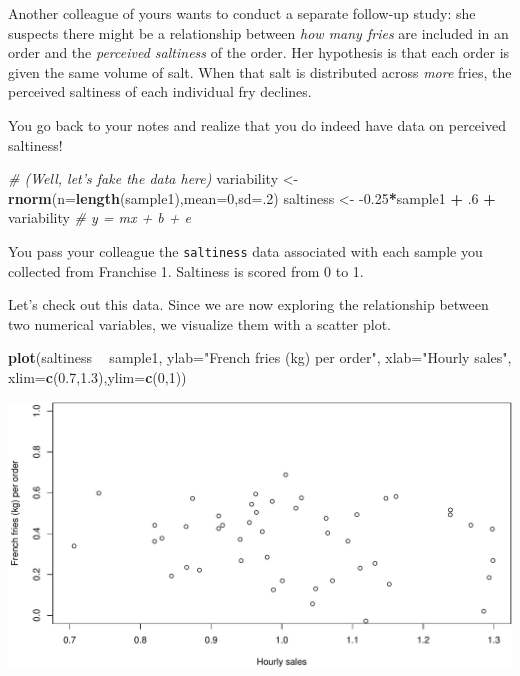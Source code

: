 \documentclass[]{book}
\newenvironment{Shaded}{\begin{snugshade}}{\end{snugshade}}
\newcommand{\CommentTok}[1]{\textcolor[rgb]{0.56,0.35,0.01}{\textit{#1}}}
\newcommand{\DataTypeTok}[1]{\textcolor[rgb]{0.13,0.29,0.53}{#1}}
\newcommand{\DecValTok}[1]{\textcolor[rgb]{0.00,0.00,0.81}{#1}}
\newcommand{\FloatTok}[1]{\textcolor[rgb]{0.00,0.00,0.81}{#1}}
\newcommand{\KeywordTok}[1]{\textcolor[rgb]{0.13,0.29,0.53}{\textbf{#1}}}
\newcommand{\NormalTok}[1]{#1}
\newcommand{\OperatorTok}[1]{\textcolor[rgb]{0.81,0.36,0.00}{\textbf{#1}}}
\newcommand{\StringTok}[1]{\textcolor[rgb]{0.31,0.60,0.02}{#1}}
\begin{document}
Another colleague of yours wants to conduct a separate follow-up study: she suspects there might be a relationship between \emph{how many fries} are included in an order and the \emph{perceived saltiness} of the order. Her hypothesis is that each order is given the same volume of salt. When that salt is distributed across \emph{more} fries, the perceived saltiness of each individual fry declines.

You go back to your notes and realize that you do indeed have data on perceived saltiness!

\begin{Shaded}
\begin{Highlighting}[]
\CommentTok{# (Well, let's fake the data here)}
\NormalTok{variability <-}\StringTok{ }\KeywordTok{rnorm}\NormalTok{(}\DataTypeTok{n=}\KeywordTok{length}\NormalTok{(sample1),}\DataTypeTok{mean=}\DecValTok{0}\NormalTok{,}\DataTypeTok{sd=}\NormalTok{.}\DecValTok{2}\NormalTok{)}
\NormalTok{saltiness <-}\StringTok{ }\FloatTok{-0.25}\OperatorTok{*}\NormalTok{sample1 }\OperatorTok{+}\StringTok{ }\FloatTok{.6} \OperatorTok{+}\StringTok{ }\NormalTok{variability }\CommentTok{# y = mx + b + e}
\end{Highlighting}
\end{Shaded}

You pass your colleague the \texttt{saltiness} data associated with each sample you collected from Franchise 1. Saltiness is scored from 0 to 1.

Let's check out this data. Since we are now exploring the relationship between two numerical variables, we visualize them with a scatter plot.

\begin{Shaded}
\begin{Highlighting}[]
\KeywordTok{plot}\NormalTok{(saltiness }\OperatorTok{~}\StringTok{ }\NormalTok{sample1,}
     \DataTypeTok{ylab=}\StringTok{"French fries (kg) per order"}\NormalTok{,}
     \DataTypeTok{xlab=}\StringTok{"Hourly sales"}\NormalTok{,}
     \DataTypeTok{xlim=}\KeywordTok{c}\NormalTok{(}\FloatTok{0.7}\NormalTok{,}\FloatTok{1.3}\NormalTok{),}\DataTypeTok{ylim=}\KeywordTok{c}\NormalTok{(}\DecValTok{0}\NormalTok{,}\DecValTok{1}\NormalTok{))}
\end{Highlighting}
\end{Shaded}

\includegraphics{figures/unnamed-chunk-334-1.pdf}
\end{document}
